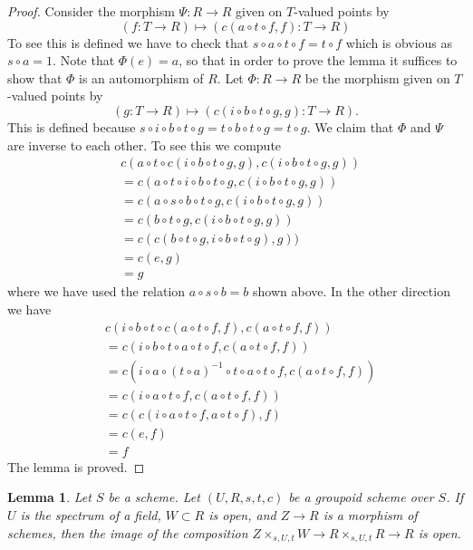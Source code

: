 \documentclass{stacks-project}
\theoremstyle{plain}
\newtheorem{lemma}[subsection]{Lemma}
\theoremstyle{definition}
\theoremstyle{remark}
\numberwithin{equation}{subsection}
\begin{document}
\begin{proof}
\medskip\noindent
Consider the morphism $\Psi : R \to R$ given on $T$-valued points
by
$$
(f : T \to R) \longmapsto (c(a \circ t \circ f, f) : T \to R)
$$
To see this is defined we have to check that
$s \circ a \circ t \circ f = t \circ f$ which is obvious as $s \circ a = 1$.
Note that $\Phi(e) = a$, so that in order to prove the lemma it
suffices to show that $\Phi$ is an automorphism of $R$.
Let $\Phi : R \to R$ be the morphism given on $T$-valued points by
$$
(g : T \to R) \longmapsto (c(i \circ b \circ t \circ g, g) : T \to R).
$$
This is defined because
$s \circ i \circ b \circ t \circ g = t \circ b \circ t \circ g =
t \circ g$. We claim that $\Phi$ and $\Psi$ are inverse to
each other. To see this we compute
\begin{align*}
& c(a \circ t \circ c(i \circ b \circ t \circ g, g),
c(i \circ b \circ t \circ g, g)) \\
& =
c(a \circ t \circ i \circ b \circ t \circ g,
c(i \circ b \circ t \circ g, g)) \\
& =
c(a \circ s \circ b \circ t \circ g,
c(i \circ b \circ t \circ g, g)) \\
& =
c(b \circ t \circ g, c(i \circ b \circ t \circ g, g)) \\
& =
c(c(b \circ t \circ g, i \circ b \circ t \circ g), g)) \\
& =
c(e, g) \\
& = g
\end{align*}
where we have used the relation $a \circ s \circ b = b$ shown above.
In the other direction we have
\begin{align*}
& c(i \circ b \circ t \circ c(a \circ t \circ f, f), c(a \circ t \circ f, f)) \\
& =
c(i \circ b \circ t \circ a \circ t \circ f, c(a \circ t \circ f, f)) \\
& =
c(i \circ a \circ (t \circ a)^{-1} \circ t \circ a \circ t \circ f,
c(a \circ t \circ f, f)) \\
& =
c(i \circ a \circ t \circ f, c(a \circ t \circ f, f)) \\
& =
c(c(i \circ a \circ t \circ f, a \circ t \circ f), f) \\
& =
c(e, f) \\
& = f
\end{align*}
The lemma is proved.
\end{proof}

\begin{lemma}
\label{lemma-groupoid-on-field-translate-open}
Let $S$ be a scheme. Let $(U, R, s, t, c)$ be a groupoid scheme
over $S$. If $U$ is the spectrum of a field, $W \subset R$ is open,
and $Z \to R$ is a morphism of schemes, then the image of the
composition $Z \times_{s, U, t} W \to R \times_{s, U, t} R \to R$ is open.
\end{lemma}
\end{document}
